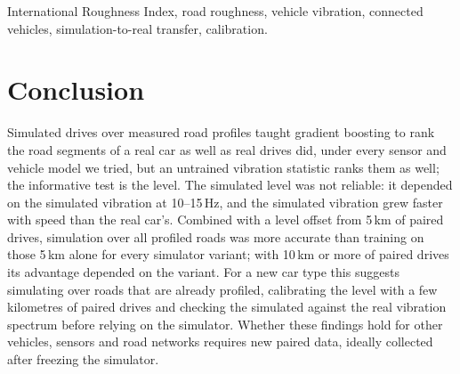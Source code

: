 \documentclass[conference]{IEEEtran}
\begin{document}
\begin{IEEEkeywords}
International Roughness Index, road roughness, vehicle vibration, connected vehicles, simulation-to-real transfer, calibration.
\end{IEEEkeywords}









\section{Conclusion}
\label{sec:conclusion}
Simulated drives over measured road profiles taught gradient boosting to rank the road segments of a real car as well as real drives did, under every sensor and vehicle model we tried, but an untrained vibration statistic ranks them as well; the informative test is the level.
The simulated level was not reliable: it depended on the simulated vibration at 10--15\,Hz, and the simulated vibration grew faster with speed than the real car's.
Combined with a level offset from 5\,km of paired drives, simulation over all profiled roads was more accurate than training on those 5\,km alone for every simulator variant; with 10\,km or more of paired drives its advantage depended on the variant.
For a new car type this suggests simulating over roads that are already profiled, calibrating the level with a few kilometres of paired drives and checking the simulated against the real vibration spectrum before relying on the simulator.
Whether these findings hold for other vehicles, sensors and road networks requires new paired data, ideally collected after freezing the simulator.


\end{document}

